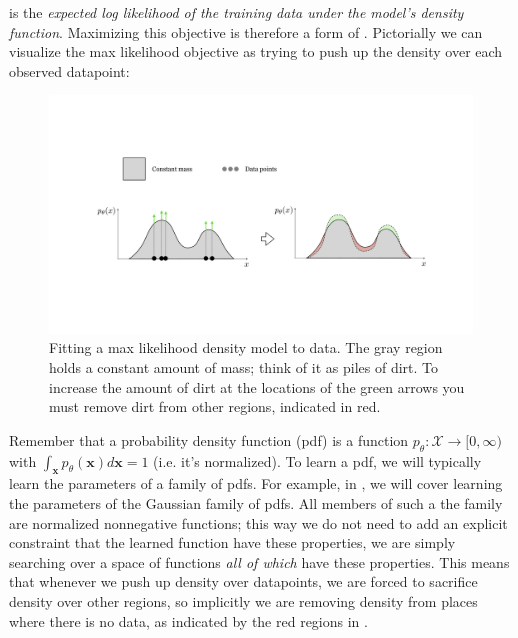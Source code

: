 \Eqn{\ref{eqn:generative_models:max_likelihood}} is the \textit{expected log likelihood of the training data under the model's density function}. Maximizing this objective is therefore a form of . Pictorially we can visualize the max likelihood objective as trying to push up the density over each observed datapoint:
\begin{figure}[h]
    \centerline{
    \includegraphics[width=1.0\linewidth]{./figures/generative_models/max_likelihood_density.pdf}
    }
    \caption{Fitting a max likelihood density model to data. The gray region holds a constant amount of mass; think of it as piles of dirt. To increase the amount of dirt at the locations of the green arrows you must remove dirt from other regions, indicated in red.}
    \label{fig:generative_models:max_likelihood_density}
\end{figure}


Remember that a probability density function (pdf) is a function $p_{\theta}: \mathcal{X} \rightarrow [0,\infty)$ with $\int_{\mathbf{x}} p_{\theta}(\mathbf{x})d\mathbf{x} = 1$ (i.e. it's normalized). To learn a pdf, we will typically learn the parameters of a family of pdfs. For example, in \sect{\ref{sec:generative_models:gaussian_density_models}}, we will cover learning the parameters of the Gaussian family of pdfs. All members of such a the family are normalized nonnegative functions; this way we do not need to add an explicit constraint that the learned function have these properties, we are simply searching over a space of functions \textit{all of which} have these properties. This means that whenever we push up density over datapoints, we are forced to sacrifice density over other regions, so implicitly we are removing density from places where there is no data, as indicated by the red regions in \fig{\ref{fig:generative_models:max_likelihood_density}}.

